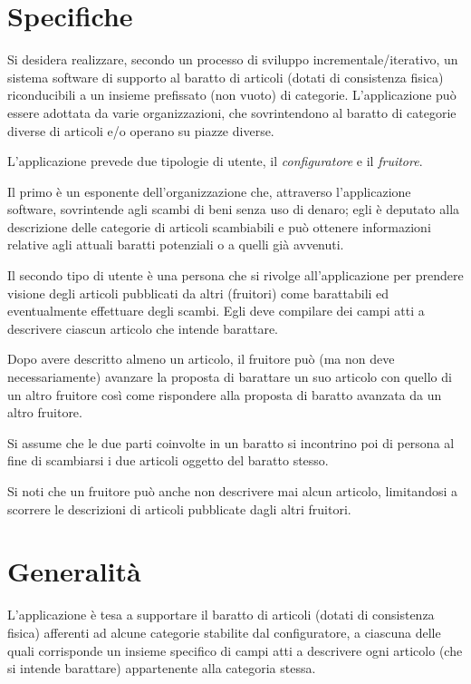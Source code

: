 \section{Specifiche}

Si desidera realizzare, secondo un processo di sviluppo incrementale/iterativo, un sistema software di supporto al baratto di articoli (dotati di consistenza fisica) riconducibili a un insieme prefissato (non vuoto) di categorie. L’applicazione può essere adottata da varie organizzazioni, che sovrintendono al baratto di categorie diverse di articoli e/o operano su piazze diverse.

L’applicazione prevede due tipologie di utente, il \textit{configuratore} e il \textit{fruitore}.

Il primo è un esponente dell’organizzazione che, attraverso l’applicazione software, sovrintende agli scambi di beni senza uso di denaro; egli è deputato alla descrizione delle categorie di articoli scambiabili e può ottenere informazioni relative agli attuali baratti potenziali o a quelli già avvenuti.

Il secondo tipo di utente è una persona che si rivolge all’applicazione per prendere visione degli articoli pubblicati da altri (fruitori) come barattabili ed eventualmente effettuare degli scambi. Egli deve compilare dei campi atti a descrivere ciascun articolo che intende barattare.

Dopo avere descritto almeno un articolo, il fruitore può (ma non deve necessariamente) avanzare la proposta di barattare un suo articolo con quello di un altro fruitore così come rispondere alla proposta di baratto avanzata da un altro fruitore.

Si assume che le due parti coinvolte in un baratto si incontrino poi di persona al fine di scambiarsi i due articoli oggetto del baratto stesso.

Si noti che un fruitore può anche non descrivere mai alcun articolo, limitandosi a scorrere le descrizioni di articoli pubblicate dagli altri fruitori.


\section{Generalità}

L’applicazione è tesa a supportare il baratto di articoli (dotati di consistenza fisica) afferenti ad alcune categorie stabilite dal configuratore, a ciascuna delle quali corrisponde un insieme specifico di campi atti a descrivere ogni articolo (che si intende barattare) appartenente alla categoria stessa.

